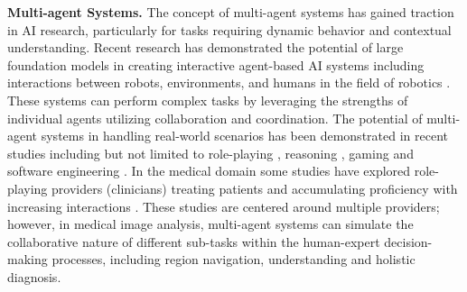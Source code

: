 \noindent\textbf{Multi-agent Systems.} The concept of multi-agent systems has gained traction in AI research, particularly for tasks requiring dynamic behavior and contextual understanding. Recent research has demonstrated the potential of large foundation models in creating interactive agent-based AI systems including interactions between robots, environments, and humans in the field of robotics \cite{durante2024interactive, han2024llm,wu2023autogen}. These systems can perform complex tasks by leveraging the strengths of individual agents utilizing collaboration and coordination. The potential of multi-agent systems in handling real-world scenarios has been demonstrated in recent studies including but not limited to role-playing \cite{li2303camel}, reasoning \cite{du2023improving}, gaming \cite{huang2024far} and software engineering \cite{he2024llm}. In the medical domain some studies have explored role-playing providers (clinicians) treating patients and accumulating proficiency with increasing interactions \cite{doctorsimul, medagentsbench}. These studies are centered around multiple providers; however, in medical image analysis, multi-agent systems can simulate the collaborative nature of different sub-tasks within the human-expert decision-making processes, including region navigation, understanding and holistic diagnosis.
